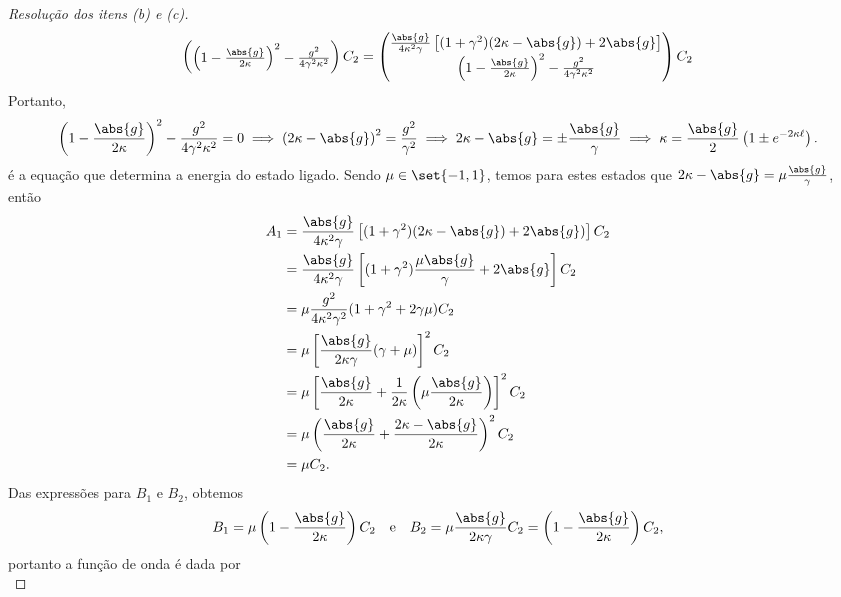 \begin{proof}[Resolução dos itens (b) e (c)]
\begin{equation*}
\begin{pmatrix}
             \left(1 - \frac{\abs{g}}{2 \kappa}\right)^2 - \frac{g^2}{4 \gamma^2 \kappa^2}
        \end{pmatrix}
        C_2 =
        \begin{pmatrix}
            \frac{\abs{g}}{4 \kappa^2 \gamma}\left[(1+\gamma^2)(2 \kappa - \abs{g}) + 2 \abs{g} \right]\\
            \left(1 - \frac{\abs{g}}{2 \kappa}\right)^2 - \frac{g^2}{4 \gamma^2 \kappa^2}
        \end{pmatrix}C_2
    \end{equation*}
    Portanto,
    \begin{equation*}
        \left(1 - \frac{\abs{g}}{2 \kappa}\right)^2 - \frac{g^2}{4 \gamma^2 \kappa^2} = 0 \implies \left(2\kappa - \abs{g}\right)^2 = \frac{g^2}{\gamma^2} \implies 2 \kappa - \abs{g} = \pm \frac{\abs{g}}{\gamma} \implies \kappa = \frac{\abs{g}}{2}\left(1 \pm e^{-2 \kappa \ell}\right).
    \end{equation*}
    é a equação que determina a energia do estado ligado. Sendo \(\mu \in \set{-1,1}\), temos para estes estados que \(2\kappa - \abs{g} = \mu \frac{\abs{g}}{\gamma}\), então
    \begin{align*}
        A_1 &= \frac{\abs{g}}{4 \kappa^2 \gamma} \left[(1 + \gamma^2)(2 \kappa - \abs{g}) + 2\abs{g})\right]C_2\\
            &= \frac{\abs{g}}{4 \kappa^2 \gamma} \left[(1 + \gamma^2)\frac{\mu\abs{g}}{\gamma} + 2\abs{g}\right]C_2\\
            &= \mu\frac{g^2}{4\kappa^2 \gamma^2}(1 + \gamma^2 + 2 \gamma \mu)C_2\\
            &= \mu\left[\frac{\abs{g}}{2 \kappa \gamma}(\gamma + \mu)\right]^2C_2\\
            &= \mu\left[\frac{\abs{g}}{2\kappa} + \frac{1}{2\kappa}\left(\mu\frac{\abs{g}}{2 \kappa}\right)\right]^2 C_2\\
            &= \mu \left(\frac{\abs{g}}{2 \kappa} + \frac{2\kappa - \abs{g}}{2\kappa}\right)^2 C_2\\
            &= \mu C_2.
    \end{align*}
    Das expressões para \(B_1\) e \(B_2\), obtemos
    \begin{equation*}
        B_1 = \mu\left(1 - \frac{\abs{g}}{2\kappa}\right)C_2\quad\text{e}\quad B_2 = \mu\frac{\abs{g}}{2\kappa \gamma}C_2 = \left(1 - \frac{\abs{g}}{2\kappa}\right)C_2,
    \end{equation*}
    portanto a função de onda é dada por
    \begin{equation*}

\end{equation*}
\end{proof}

